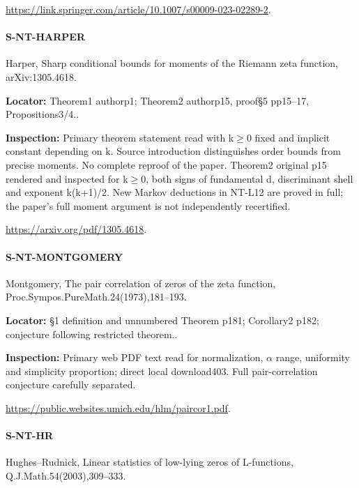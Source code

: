 \documentclass[11pt,a4paper]{article}
\begin{document}
\url{https://link.springer.com/article/10.1007/s00009-023-02289-2}.

\paragraph{S-NT-HARPER} Harper, Sharp conditional bounds for moments of the Riemann zeta function, arXiv:\allowbreak{}1305.\allowbreak{}4618.

\textbf{Locator:} Theorem1 authorp1; Theorem2 authorp15, proof§5 pp15–\allowbreak{}17, Propositions3/\allowbreak{}4.\allowbreak{}.

\textbf{Inspection:} Primary theorem statement read with k\ensuremath{\ge}0 fixed and implicit constant depending on k.\allowbreak{} Source introduction distinguishes order bounds from precise moments.\allowbreak{} No complete reproof of the paper.\allowbreak{} Theorem2 original p15 rendered and inspected for k\ensuremath{\ge}0, both signs of fundamental d, discriminant shell and exponent k(k+1)/\allowbreak{}2.\allowbreak{} New Markov deductions in NT-L12 are proved in full; the paper’s full moment argument is not independently recertified.\allowbreak{}

\url{https://arxiv.org/pdf/1305.4618}.

\paragraph{S-NT-MONTGOMERY} Montgomery, The pair correlation of zeros of the zeta function, Proc.\allowbreak{}Sympos.\allowbreak{}PureMath.\allowbreak{}24(1973),181–\allowbreak{}193.

\textbf{Locator:} §1 definition and unnumbered Theorem p181; Corollary2 p182; conjecture following restricted theorem.\allowbreak{}.

\textbf{Inspection:} Primary web PDF text read for normalization, \ensuremath{\alpha} range, uniformity and simplicity proportion; direct local download403.\allowbreak{} Full pair-correlation conjecture carefully separated.\allowbreak{}

\url{https://public.websites.umich.edu/hlm/paircor1.pdf}.

\paragraph{S-NT-HR} Hughes–\allowbreak{}Rudnick, Linear statistics of low-lying zeros of L-functions, Q.\allowbreak{}J.\allowbreak{}Math.\allowbreak{}54(2003),309–\allowbreak{}333.
\end{document}
